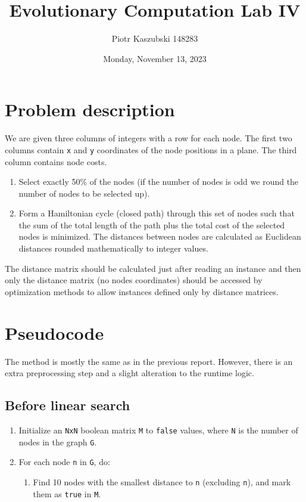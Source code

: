 \documentclass[14pt]{article}
\title{Evolutionary Computation Lab IV}
\author{Piotr Kaszubski 148283}
\date{Monday, November 13, 2023}
\begin{document}
\maketitle
\tableofcontents
\newpage

\section{Problem description}
We are given three columns of integers with a row for each node. The first two
columns contain \verb`x` and \verb`y` coordinates of the node positions in a
plane. The third column contains node costs.

\begin{enumerate}
	\item Select exactly 50\% of the nodes (if the number of nodes is odd we
		round the number of nodes to be selected up).
	\item Form a Hamiltonian cycle (closed path) through this set of nodes such
		that the sum of the total length of the path plus the total cost of the
		selected nodes is minimized. The distances between nodes are calculated
		as Euclidean distances rounded mathematically to integer values.
\end{enumerate}

The distance matrix should be calculated just after reading an instance and
then only the distance matrix (no nodes coordinates) should be accessed by
optimization methods to allow instances defined only by distance matrices.

\section{Pseudocode}
The method is mostly the same as in the previous report. However, there is an
extra preprocessing step and a slight alteration to the runtime logic.

\subsection{Before linear search}
\begin{enumerate}
	\item Initialize an \verb`NxN` boolean matrix \verb`M` to \verb`false`
		values, where \verb`N` is the number of nodes in the graph \verb`G`.
	\item For each node \verb`n` in \verb`G`, do:
		\begin{enumerate}
			\item Find 10 nodes with the smallest distance to \verb`n`
				(excluding \verb`n`), and mark them as \verb`true` in \verb`M`.
		\end{enumerate}
\end{enumerate}
\end{document}
